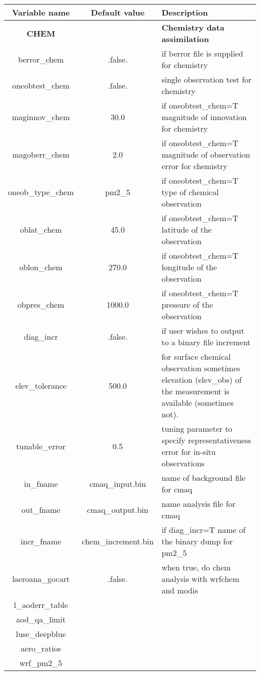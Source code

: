 \begin{table}[h]
 \footnotesize
 \center
 \begin{tabular}{| c | c | p{7cm} |}
 \hline
 Variable name & Default value & Description \\
 \hline
\textbf{CHEM} & &  \textbf{Chemistry data assimilation} \\
 \hline
 berror\_chem & .false. & if berror file is supplied for chemistry \\
 \hline
 oneobtest\_chem & .false. & single observation test for chemistry \\
 \hline
 maginnov\_chem & 30.0 & if oneobtest\_chem=T magnitude of innovation for chemistry \\
 \hline
 magoberr\_chem & 2.0 & if oneobtest\_chem=T magnitude of observation error for chemistry \\
 \hline
 oneob\_type\_chem & pm2\_5 & if oneobtest\_chem=T type of chemical observation \\
 \hline
 oblat\_chem & 45.0 & if oneobtest\_chem=T latitude of the observation \\
 \hline
 oblon\_chem	& 270.0	& if oneobtest\_chem=T longitude of the observation \\
 \hline
 obpres\_chem & 1000.0 & if oneobtest\_chem=T  pressure of the observation \\
 \hline
 diag\_incr & .false. & if user wishes to output to a binary file increment \\
 \hline
 elev\_tolerance & 500.0 & for surface chemical observation sometimes elevation (elev\_obs) of the measurement is available (sometimes not). \\
 \hline
 tunable\_error & 0.5 & tuning parameter to specify representativeness error for in-situ observations \\
 \hline
 in\_fname & cmaq\_input.bin	& name of background file for cmaq \\
 \hline
 out\_fname & cmaq\_output.bin & name analysis file for cmaq \\
 \hline
 incr\_fname & chem\_increment.bin & if diag\_incr=T name of the binary dump for pm2\_5 \\
 \hline
 laeroana\_gocart & .false. & when true, do chem analysis with wrfchem and modis \\
 \hline
 l\_aoderr\_table & & \\
 \hline
 aod\_qa\_limit & & \\
 \hline
 luse\_deepblue & & \\
 \hline
 aero\_ratios & & \\ 
 \hline
 wrf\_pm2\_5 & & \\
 \hline
 \end{tabular}
\end{table}
